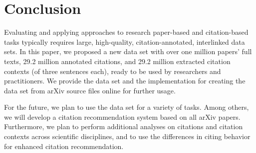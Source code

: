 \section{Conclusion}
\label{sec:conclusion}

Evaluating and applying approaches to research paper-based and citation-based tasks typically requires large, high-quality, citation-annotated, interlinked data sets. In this paper, we proposed a new data set with over one million papers' full texts, 29.2 million annotated citations, and 29.2 million extracted citation contexts (of three sentences each), ready to be used by researchers and practitioners.
We provide the data set and the implementation for creating the data set from arXiv source files online for further usage.

For the future, we plan to use the data set for a variety of tasks. Among others, we will develop a citation recommendation system based on all arXiv papers. Furthermore, we plan to perform additional analyses on citations and citation contexts across scientific disciplines, and to use the differences in citing behavior for enhanced citation recommendation.

